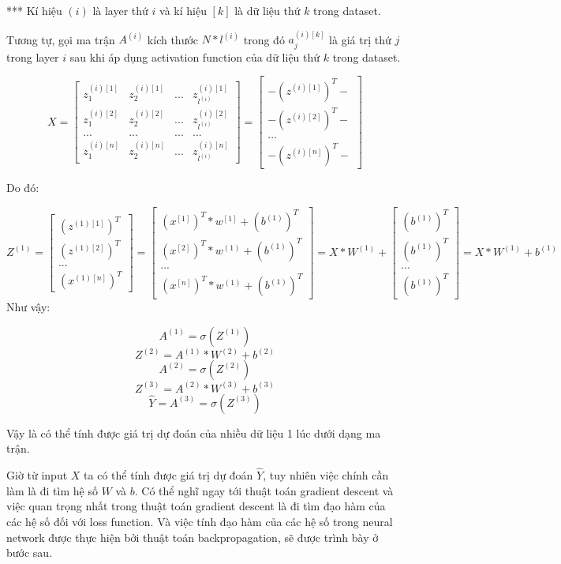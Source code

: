 *** Kí hiệu $(i)$ là layer thứ $i$ và kí hiệu $[k]$ là dữ liệu thứ $k$ trong dataset.

Tương tự, gọi ma trận $A^{(i)}$ kích thước $N*l^{(i)}$ trong đó $a_{j}^{(i)[k]}$ là giá trị thứ $j$ trong layer $i$ sau khi áp dụng activation function của dữ liệu thứ $k$ trong dataset.

$$ X = \begin{bmatrix}z_{1}^{(i)[1]}&z_{2}^{(i)[1]}&...&z_{l^{(i)}}^{(i)[1]}\\z_{1}^{(i)[2]}&z_{2}^{(i)[2]}&...&z_{l^{(i)}}^{(i)[2]}\\...&...&...&...\\z_{1}^{(i)[n]}&z_{2}^{(i)[n]}&...&z_{l^{(i)}}^{(i)[n]}\end{bmatrix} =  \begin{bmatrix}-(z^{(i)[1]})^{T}-\\-(z^{(i)[2]})^{T}-\\...\\-(z^{(i)[n]})^{T}-\end{bmatrix} $$

Do đó:

$$Z^{(1)} = \begin{bmatrix}(z^{(1)[1]})^{T}\\(z^{(1)[2]})^{T}\\...\\(x^{(1)[n]})^{T}\end{bmatrix} 
= \begin{bmatrix}(x^{[1]})^{T}*w^{[1]}+(b^{(1)})^{T}\\(x^{[2]})^{T}*w^{(1)}+(b^{(1)})^{T}\\...\\(x^{[n]})^{T}*w^{(1)}+(b^{(1)})^{T}\end{bmatrix}
= X*W^{(1)}+\begin{bmatrix}(b^{(1)})^{T}\\(b^{(1)})^{T}\\...\\(b^{(1)})^{T}\end{bmatrix}
= X*W^{(1)}+b^{(1)}$$
Như vậy:

$$A^{(1)} =  \sigma (Z^{(1)})$$
$$Z^{(2)} = A^{(1)}*W^{(2)} + b^{(2)}$$
$$A^{(2)} =  \sigma (Z^{(2)})$$
$$Z^{(3)} = A^{(2)}*W^{(3)} + b^{(3)}$$
$$\hat{Y} = A^{(3)} =  \sigma (Z^{(3)})$$

Vậy là có thể tính được giá trị dự đoán của nhiều dữ liệu 1 lúc dưới dạng ma trận.

Giờ từ input $X$ ta có thể tính được giá trị dự đoán $\hat{Y}$, tuy nhiên việc chính cần làm là đi tìm hệ số $W$ và $b$. Có thể nghĩ ngay tới thuật toán gradient descent và việc quan trọng nhất trong thuật toán gradient descent là đi tìm đạo hàm của các hệ số đối với loss function. Và việc tính đạo hàm của các hệ số trong neural network được thực hiện bởi thuật toán backpropagation, sẽ được trình bày ở bước sau.

